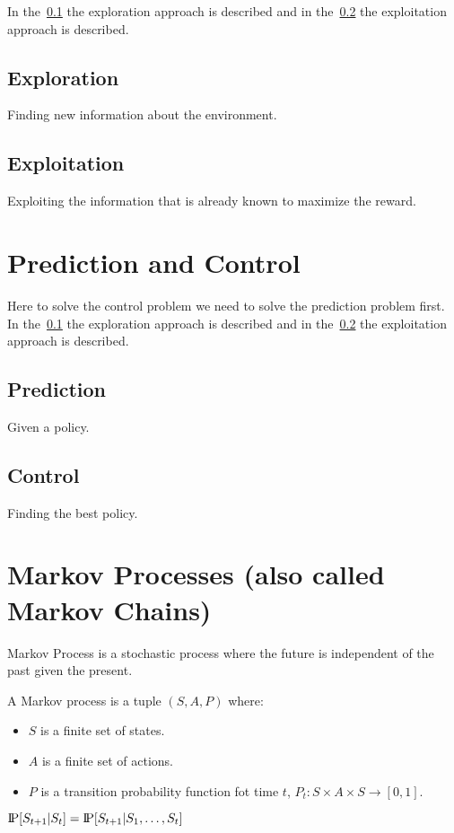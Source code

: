 In the~\ref{subsec:exploration} the exploration approach is described and
in the~\ref{subsec:exploitation} the exploitation approach is described.

\subsection{Exploration}\label{subsec:exploration}
Finding new information about the environment.

\subsection{Exploitation}\label{subsec:exploitation}
Exploiting the information that is already known to maximize the reward.


\section{Prediction and Control}\label{sec:prediction-vs.-control}
Here to solve the control problem we need to solve the prediction problem first.
In the~\ref{subsec:exploration} the exploration approach is described and
in the~\ref{subsec:exploitation} the exploitation approach is described.

\subsection{Prediction}\label{subsec:prediction}
Given a policy.

\subsection{Control}\label{subsec:control}
Finding the best policy.


\section{Markov Processes (also called Markov Chains)}\label{sec:markov-processes}
Markov Process is a stochastic process where the future is independent of the past given the present.

\begin{definition}
    A Markov process is a tuple $(S,A,P)$ where:
    \begin{itemize}
        \item $S$ is a finite set of states.
        \item $A$ is a finite set of actions.
        \item $P$ is a transition probability function fot time $t$, $P_t:S\times A\times S\to[0,1]$.
    \end{itemize}
\end{definition}
$\text{I\kern-0.15em P}[S_{t+1}|S_t] = \text{I\kern-0.15em P}[S_{t+1}|S_1,\ldots,S_t]$


